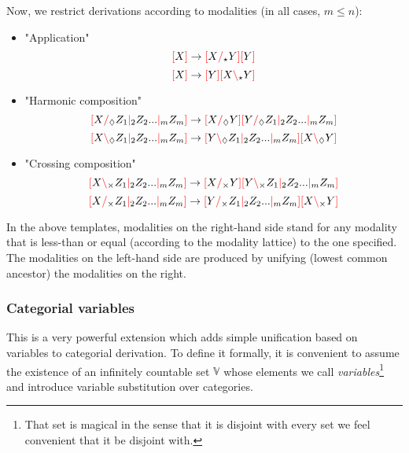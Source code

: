 \documentclass[main.tex]{subfiles}
\begin{document}
Now, we restrict derivations according to modalities (in all cases, $m \leq n$):
\begin{itemize}
    \item "Application"
        \[ \lb X \rb \rightarrow \lb X \rc_\modstar Y \rb \lb Y \rb \]
        \[ \lb X \rb \rightarrow \lb Y \rb \lb X \lc_\modstar Y \rb \]
    \item "Harmonic composition"
        \[ \lb X \rc_\modr Z_1 \mc_2 Z_2 ... \mc_m Z_m \rb \rightarrow \lb X \rc_\modr Y \rb \lb Y \rc_\modr Z_1 \mc_2 Z_2 ... \mc_m Z_m \rb \]
        \[ \lb X \lc_\modr Z_1 \mc_2 Z_2 ... \mc_m Z_m \rb \rightarrow \lb Y \lc_\modr Z_1 \mc_2 Z_2 ... \mc_m Z_m \rb \lb X \lc_\modr Y \rb \]
    \item "Crossing composition"
        \[ \lb X \lc_\modx Z_1 \mc_2 Z_2 ... \mc_m Z_m \rb \rightarrow \lb X \rc_\modx Y \rb \lb Y \lc_\modx Z_1 \mc_2 Z_2 ... \mc_m Z_m \rb \]
        \[ \lb X \rc_\modx Z_1 \mc_2 Z_2 ... \mc_m Z_m \rb \rightarrow \lb Y \rc_\modx Z_1 \mc_2 Z_2 ... \mc_m Z_m \rb \lb X \lc_\modx Y \rb \]
\end{itemize}

In the above templates, modalities on the right-hand side stand for any
modality that is less-than or equal (according to the modality lattice)
to the one specified. The modalities on the left-hand side are produced by
unifying (lowest common ancestor) the modalities on the right.


\subsubsection{Categorial variables}
This is a very powerful extension which adds simple unification based on variables
to categorial derivation. To define it formally, it is convenient to assume
the existence of an infinitely countable set $\mathbb{V}$ whose elements
we call \emph{variables}\footnote{That set is magical in the sense that it is
    disjoint with every set we feel convenient that it be disjoint with.}
and introduce variable substitution over categories.
\end{document}
